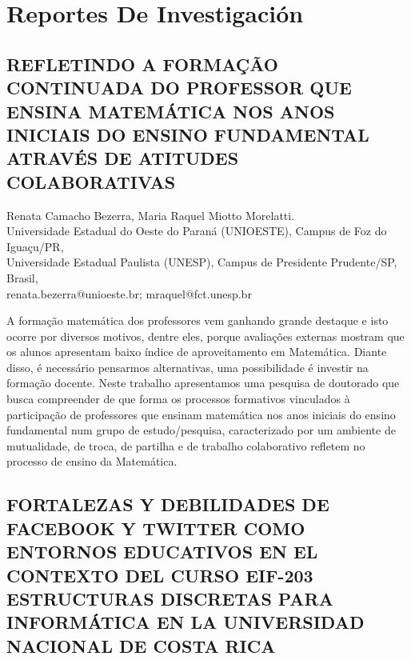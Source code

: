 
\pagestyle{headings}
\fontsize{7}{8}\selectfont
\pagecolor{white} 

\onecolumn
\chapter{Reportes De Investigación } 
\renewcommand\thesection{RI\ \nplpadding{3}\numprint{\arabic{section}}} 
\setcounter{section}{0}
\chaptertoc
\twocolumn
\balance



\section{REFLETINDO A FORMAÇÃO CONTINUADA DO PROFESSOR QUE ENSINA MATEMÁTICA
NOS ANOS INICIAIS DO ENSINO FUNDAMENTAL ATRAVÉS DE ATITUDES COLABORATIVAS}

\begin{datos}
Renata Camacho Bezerra, Maria Raquel Miotto Morelatti. \\
Universidade Estadual do Oeste do Paraná (UNIOESTE), Campus de Foz do Iguaçu/PR,\\
Universidade Estadual Paulista (UNESP), Campus de Presidente Prudente/SP,  \\ 
Brasil,\\
\hfill  renata.bezerra@unioeste.br; mraquel@fct.unesp.br  
\end{datos}

A formação matemática dos professores vem ganhando grande destaque
e isto ocorre por diversos motivos, dentre eles, porque avaliações
externas mostram que os alunos apresentam baixo índice de aproveitamento
em Matemática. Diante disso, é necessário pensarmos alternativas,
uma possibilidade é investir na formação docente. Neste trabalho apresentamos
uma pesquisa de doutorado que busca compreender de que forma os processos
formativos vinculados à participação de professores que ensinam matemática
nos anos iniciais do ensino fundamental num grupo de estudo/pesquisa,
caracterizado por um ambiente de mutualidade, de troca, de partilha
e de trabalho colaborativo refletem no processo de ensino da Matemática.


\section{\uppercase{ Fortalezas y debilidades de Facebook y Twitter como
entornos educativos en el contexto del curso EIF-203 Estructuras Discretas
para Informática en la Universidad Nacional de Costa Rica}}

